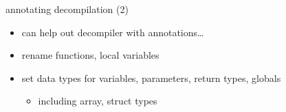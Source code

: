 \begin{frame}{annotating decompilation (2)}
    \begin{itemize}
    \item can help out decompiler with annotations\ldots
    \vspace{.5cm}
    \item rename functions, local variables
    \item set data types for variables, parameters, return types, globals
        \begin{itemize}
        \item including array, struct types
        \end{itemize}
    \end{itemize}
\end{frame}
